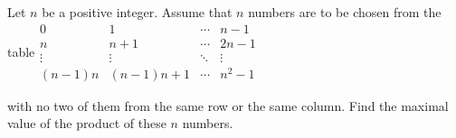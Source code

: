 Let $n$ be a positive integer. Assume that $n$ numbers are to be chosen from the table$\begin{array}{cccc}0 & 1 & \cdots & n-1\\ n & n+1 & \cdots & 2n-1\\ \vdots & \vdots & \ddots & \vdots\\(n-1)n & (n-1)n+1 & \cdots & n^2-1\end{array} $

with no two of them from the same row or the same column. Find the maximal value of the product of these $n$ numbers.